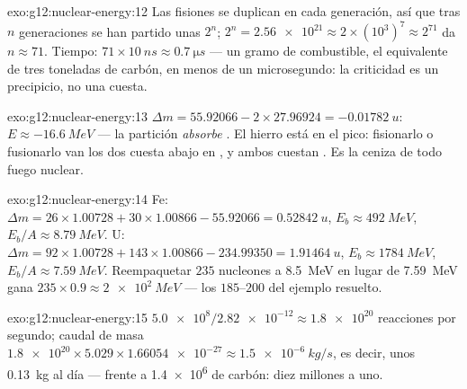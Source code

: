\begin{solution}{exo:g12:nuclear-energy:12}
Las fisiones se duplican en cada generación, así que tras $n$
generaciones se han partido unas $2^n$;
$2^{n} = \num{2.56e21} \approx 2 \times (10^{3})^{7} \approx 2^{71}$ da
$n \approx 71$. Tiempo: $71 \times \qty{10}{ns} \approx
\qty{0.7}{\micro s}$ --- un gramo de combustible, el equivalente de tres
toneladas de carbón, en menos de un microsegundo: la criticidad es un
precipicio, no una cuesta.
\end{solution}

\begin{solution}{exo:g12:nuclear-energy:13}
$\Delta m = 55.92066 - 2 \times 27.96924 = \qty{-0.01782}{u}$:
$E \approx \qty{-16.6}{MeV}$ --- la partición \emph{absorbe} . El
hierro está en el pico: fisionarlo o fusionarlo van los dos cuesta abajo
en , y ambos cuestan . Es la ceniza de todo
fuego nuclear.
\end{solution}

\begin{solution}{exo:g12:nuclear-energy:14}
Fe: $\Delta m = 26 \times 1.00728 + 30 \times 1.00866 - 55.92066 =
\qty{0.52842}{u}$, $E_b \approx \qty{492}{MeV}$,
$E_b/A \approx \qty{8.79}{MeV}$. U:
$\Delta m = 92 \times 1.00728 + 143 \times 1.00866 - 234.99350 =
\qty{1.91464}{u}$, $E_b \approx \qty{1784}{MeV}$,
$E_b/A \approx \qty{7.59}{MeV}$. Reempaquetar $235$ nucleones a
\qty{8.5}{MeV} en lugar de \qty{7.59}{MeV} gana
$235 \times 0.9 \approx \qty{2e2}{MeV}$ --- los $185$--$200$ del ejemplo
resuelto.
\end{solution}

\begin{solution}{exo:g12:nuclear-energy:15}
$\num{5.0e8}/\num{2.82e-12} \approx \num{1.8e20}$ reacciones por
segundo; caudal de masa
$\num{1.8e20} \times 5.029 \times \num{1.66054e-27} \approx
\qty{1.5e-6}{kg/s}$, es decir, unos \qty{0.13}{kg} al día --- frente a
\num{1.4e6}  de carbón: diez millones a uno.
\end{solution}


